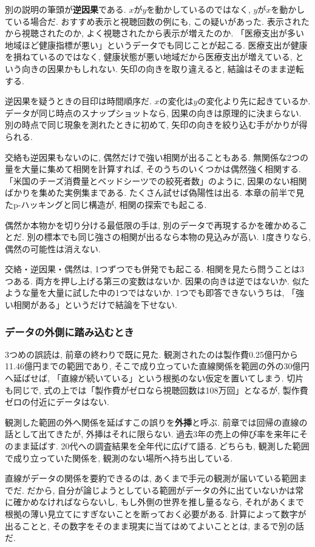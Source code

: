 別の説明の筆頭が\textbf{逆因果}である.
$x$が$y$を動かしているのではなく, $y$が$x$を動かしている場合だ.
おすすめ表示と視聴回数の例にも, この疑いがあった. 表示されたから視聴されたのか, よく視聴されたから表示が増えたのか.
「医療支出が多い地域ほど健康指標が悪い」というデータでも同じことが起こる.
医療支出が健康を損ねているのではなく, 健康状態が悪い地域だから医療支出が増えている, という向きの因果かもしれない.
矢印の向きを取り違えると, 結論はそのまま逆転する.

逆因果を疑うときの目印は時間順序だ.
$x$の変化は$y$の変化より先に起きているか.
データが同じ時点のスナップショットなら, 因果の向きは原理的に決まらない.
別の時点で同じ現象を測れたときに初めて, 矢印の向きを絞り込む手がかりが得られる.

交絡も逆因果もないのに, 偶然だけで強い相関が出ることもある.
無関係な2つの量を大量に集めて相関を計算すれば, そのうちのいくつかは偶然強く相関する.
「米国のチーズ消費量とベッドシーツでの絞死者数」のように, 因果のない相関ばかりを集めた実例集まである.
たくさん試せば偽陽性は出る. 本章の前半で見たp-ハッキングと同じ構造が, 相関の探索でも起こる.

偶然か本物かを切り分ける最低限の手は, 別のデータで再現するかを確かめることだ.
別の標本でも同じ強さの相関が出るなら本物の見込みが高い. 1度きりなら, 偶然の可能性は消えない.

交絡・逆因果・偶然は, 1つずつでも併発でも起こる.
相関を見たら問うことは3つある. 両方を押し上げる第三の変数はないか. 因果の向きは逆ではないか. 似たような量を大量に試した中の1つではないか.
1つでも即答できないうちは, 「強い相関がある」というだけで結論を下せない.

\subsubsection*{データの外側に踏み込むとき}

3つめの誤読は, 前章の終わりで既に見た.
観測されたのは製作費0.25億円から11.46億円までの範囲であり, そこで成り立っていた直線関係を範囲の外の30億円へ延ばせば, 「直線が続いている」という根拠のない仮定を置いてしまう.
切片も同じで, 式の上では「製作費がゼロなら視聴回数は108万回」となるが, 製作費ゼロの付近にデータはない.

観測した範囲の外へ関係を延ばすこの誤りを\textbf{外挿}と呼ぶ.
前章では回帰の直線の話として出てきたが, 外挿はそれに限らない.
過去3年の売上の伸び率を来年にそのまま延ばす. 20代への調査結果を全年代に広げて語る.
どちらも, 観測した範囲で成り立っていた関係を, 観測のない場所へ持ち出している.

直線がデータの関係を要約できるのは, あくまで手元の観測が届いている範囲までだ.
だから, 自分が論じようとしている範囲がデータの外に出ていないかは常に確かめなければならないし, もし外側の世界を推し量るなら, それがあくまで根拠の薄い見立てにすぎないことを断っておく必要がある. 計算によって数字が出ることと, その数字をそのまま現実に当てはめてよいこととは, まるで別の話だ.


